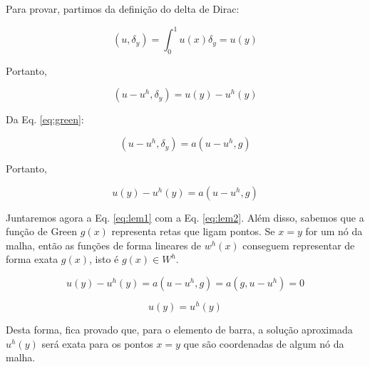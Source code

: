     Para provar, partimos da definição do delta de Dirac:

    \begin{equation}
        (u,\delta_y) = \int_{0}^{1} u(x) \delta_y = u(y)
    \end{equation}

    Portanto,

    \begin{equation}
        (u-u^h,\delta_y) = u(y) - u^h(y)
    \end{equation}

    Da Eq. \eqref{eq:green}:

    \begin{equation}
        (u-u^h,\delta_y) = a(u-u^h,g)
    \end{equation}

    Portanto,

    \begin{equation}
        u(y) - u^h(y) = a(u-u^h,g)
    \end{equation}

    Juntaremos agora a Eq. \eqref{eq:lem1} com a Eq. \eqref{eq:lem2}. Além disso, sabemos que a função de Green $g(x)$ representa retas que ligam pontos. Se $x=y$ for um nó da malha, então as funções de forma lineares de $w^h(x)$ conseguem representar de forma exata $g(x)$, isto é $g(x) \in W^h$.

    \begin{equation*}
        u(y) - u^h(y) = a(u-u^h,g) = a(g, u-u^h) = 0
    \end{equation*}

    \begin{equation}
        u(y) = u^h(y)
    \end{equation}

    Desta forma, fica provado que, para o elemento de barra, a solução aproximada $u^h(y)$ será exata para os pontos $x=y$ que são coordenadas de algum nó da malha.
